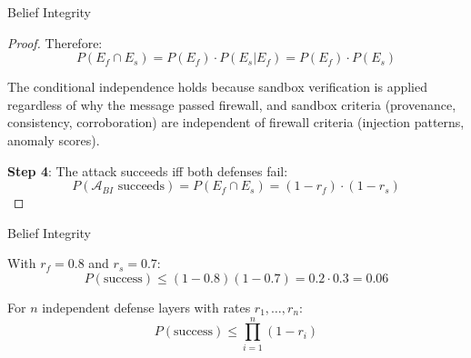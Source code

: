 \documentclass[
  ignorenonframetext,
]{beamer}
\begin{document}
\begin{frame}[allowframebreaks]{Belief Integrity}
\begin{proof}
Therefore:
\begin{equation}
\label{eq:defense-independence}
P(E_f \cap E_s) = P(E_f) \cdot P(E_s | E_f) = P(E_f) \cdot P(E_s)
\end{equation}

The conditional independence holds because sandbox verification is applied regardless of why the message passed firewall, and sandbox criteria (provenance, consistency, corroboration) are independent of firewall criteria (injection patterns, anomaly scores).

\textbf{Step 4}: The attack succeeds iff both defenses fail:
\begin{equation}
\label{eq:attack-success-prob}
P(\mathcal{A}_{BI} \text{ succeeds}) = P(E_f \cap E_s) = (1 - r_f) \cdot (1 - r_s)
\end{equation}
\end{proof}

\end{frame}

\begin{frame}[allowframebreaks]{Belief Integrity}
\begin{corollary}
\label{cor:empirical-security}
With $r_f = 0.8$ and $r_s = 0.7$:
\begin{equation}
\label{eq:empirical-bound}
P(\text{success}) \leq (1 - 0.8)(1 - 0.7) = 0.2 \cdot 0.3 = 0.06
\end{equation}
\end{corollary}

\begin{corollary}
\label{cor:n-layer-bound}
For $n$ independent defense layers with rates $r_1, \ldots, r_n$:
\begin{equation}
\label{eq:n-layer-bound}
P(\text{success}) \leq \prod_{i=1}^{n} (1 - r_i)
\end{equation}
\end{corollary}
\end{frame}
\end{document}
